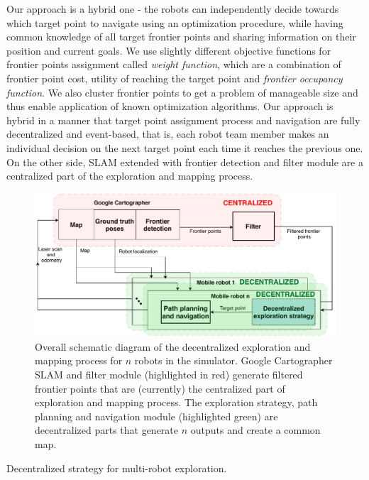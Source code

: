 Our approach is a hybrid one - the robots can independently decide towards which target point to navigate using an optimization procedure, while having common knowledge of all target frontier points and sharing information on their position and current goals. We use slightly different objective functions for frontier points assignment called \textit{weight function}, which are a combination of frontier point cost, utility of reaching the target point and \textit{frontier occupancy function}. We also cluster frontier points to get a problem of manageable size and thus enable application of known optimization algorithms. 
Our approach is hybrid in a manner that target point assignment process and navigation are fully decentralized and event-based, that is, each robot team member makes an individual decision on the next target point each time it reaches the previous one. On the other side, SLAM extended with frontier detection and filter module are a centralized part of the exploration and mapping process.


\begin{figure}[t!]
	\centering\includegraphics[width=1.0\columnwidth]{./pictures/diagram_exploration.pdf}
	\caption{Overall schematic diagram of the decentralized exploration and mapping process for $n$ robots in the simulator. Google Cartographer SLAM and filter module (highlighted in red) generate filtered frontier points that are (currently) the centralized part of exploration and mapping process. The exploration strategy, path planning and navigation module (highlighted green) are decentralized parts that generate $n$ outputs and create a common map.}
	\label{fig:exploration-strategy}
\end{figure}


\begin{algorithm}[b!]
	\label{algorithm1}
	\caption{Decentralized strategy for multi-robot exploration.}
\end{algorithm}


